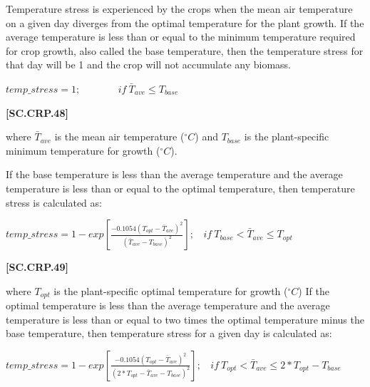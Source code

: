 Temperature stress is experienced by the crops when the mean air temperature on a given day diverges from the optimal temperature for the plant growth.  If the average temperature is less than or equal to the minimum temperature required for crop growth, also called the base temperature, then the temperature stress for that day will be 1 and the crop will not accumulate any biomass.
   \vspace{0.2cm}

    \begin{center}
        \(temp\_stress=1;\ \ \ \ \ \ \ \ \ \ \ \ \ \ \ \ \ if\ \bar{T}_{ave} \leq T_{base} \) 
    \end{center}
        \vspace{0.5cm}
    
            {\raggedleft \textbf{[SC.CRP.48]}\par}
            \vspace{0.5cm}

where \( \bar{T}_{ave}\) is the mean air temperature (\(^\circ C\)) and \(T_{base}\)  is the plant-specific minimum temperature for growth (\(^\circ C\)).

If the base temperature is less than the average temperature and the average temperature is less than or equal to the optimal temperature, then temperature stress is calculated as:
   \vspace{0.2cm}

    \begin{center}
        \(temp\_stress=1-exp[\frac{-0.1054(T_{opt}- \bar{T}_{ave})^2}{ (\bar{T}_{ave}-T_{base})^2}];\ \ \ \ if\  T_{base} < \bar{T}_{ave} \leq T_{opt}\) 
    \end{center}
        \vspace{0.5cm}
    
            {\raggedleft \textbf{[SC.CRP.49]}\par}
            \vspace{0.5cm}

where \(T_{opt}\) is the plant-specific optimal temperature for growth (\(^\circ C\))
If the optimal temperature is less than the average temperature and the average temperature is less than or equal to two times the optimal temperature minus the base temperature, then temperature stress for a given day is calculated as:
   \vspace{0.2cm}

    \begin{center}
        \(temp\_stress=1-exp[\frac{-0.1054(T_{opt}- \bar{T}_{ave})^2}{ (2 * T_{opt} -\bar{T}_{ave}-T_{base})^2}];\ \ \ \ if\  T_{opt} < \bar{T}_{ave} \leq 2 * T_{opt} - T_{base}\) 
    \end{center}
        \vspace{0.5cm}
    
